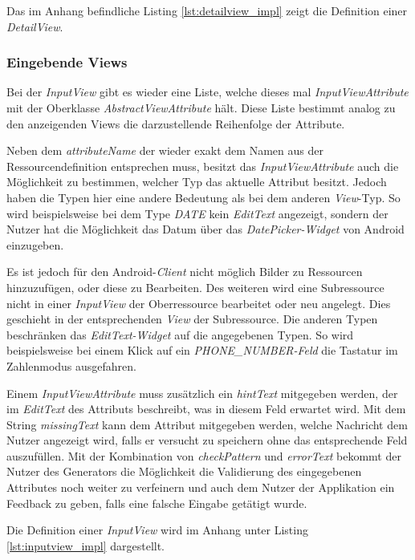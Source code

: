 Das im Anhang befindliche Listing \ref{lst:detailview_impl} zeigt die Definition einer \textit{DetailView}.

\subsubsection{Eingebende Views}

Bei der \textit{InputView} gibt es wieder eine Liste, welche dieses mal \textit{InputViewAttribute} mit der Oberklasse \textit{AbstractViewAttribute} hält. Diese Liste bestimmt analog zu den anzeigenden Views die darzustellende Reihenfolge der Attribute. 

Neben dem \textit{attributeName} der wieder exakt dem Namen aus der Ressourcendefinition entsprechen muss, besitzt das \textit{InputViewAttribute} auch die Möglichkeit zu bestimmen, welcher Typ das aktuelle Attribut besitzt. Jedoch haben die Typen hier eine andere Bedeutung als bei dem anderen \textit{View}-Typ. So wird beispielsweise bei dem Type \textit{DATE} kein \textit{EditText} angezeigt, sondern der Nutzer hat die Möglichkeit das Datum über das \textit{DatePicker-Widget} von Android einzugeben. 

Es ist jedoch für den Android-\textit{Client} nicht möglich Bilder zu Ressourcen hinzuzufügen, oder diese zu Bearbeiten. Des weiteren wird eine Subressource nicht in einer \textit{InputView} der Oberressource bearbeitet oder neu angelegt. Dies geschieht in der entsprechenden \textit{View} der Subressource. Die anderen Typen beschränken das \textit{EditText-Widget} auf die angegebenen Typen. So wird beispielsweise bei einem Klick auf ein \textit{PHONE\_NUMBER-Feld} die Tastatur im Zahlenmodus ausgefahren.

Einem \textit{InputViewAttribute} muss zusätzlich ein \textit{hintText} mitgegeben werden, der im \textit{EditText} des Attributs beschreibt, was in diesem Feld erwartet wird. Mit dem String \textit{missingText} kann dem Attribut mitgegeben werden, welche Nachricht dem Nutzer angezeigt wird, falls er versucht zu speichern ohne das entsprechende Feld auszufüllen. Mit der Kombination von \textit{checkPattern} und \textit{errorText} bekommt der Nutzer des Generators die Möglichkeit die Validierung des eingegebenen Attributes noch weiter zu verfeinern und auch dem Nutzer der Applikation ein Feedback zu geben, falls eine falsche Eingabe getätigt wurde.

Die Definition einer \textit{InputView} wird im Anhang unter Listing \ref{lst:inputview_impl} dargestellt.

